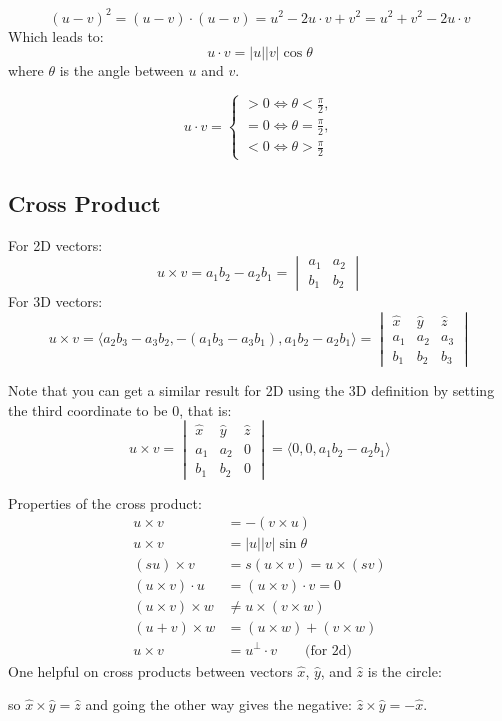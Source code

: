 \documentclass[12pt]{report}
\begin{document}
$$
(u - v)^2 = (u - v)\cdot(u - v) = u^2 -2u\cdot v + v^2 = u^2 + v^2 -2u\cdot v
$$
Which leads to:
$$
u \cdot v = |u||v|\cos\theta
$$
where $\theta$ is the angle between $u$ and $v$.
	
$$
u \cdot v = \begin{cases}
> 0 \Leftrightarrow \theta < \frac{\pi}{2},\\
= 0 \Leftrightarrow \theta = \frac{\pi}{2}, \\
< 0 \Leftrightarrow \theta > \frac{\pi}{2}
\end{cases}
$$
	
\subsection{Cross Product}
For 2D vectors:
$$
u \times v = a_1b_2 - a_2b_1 = \begin{vmatrix}a_1 & a_2 \\ b_1 & b_2 \end{vmatrix}
$$
For 3D vectors:
$$
u \times v = \langle a_2b_3 - a_3b_2, -(a_1b_3 - a_3b_1), a_1b_2 - a_2b_1\rangle = \begin{vmatrix}\hat{x} & \hat{y} & \hat{z} \\ a_1 & a_2 & a_3 \\ b_1 & b_2 & b_3\end{vmatrix}
$$
	
Note that you can get a similar result for 2D using the 3D definition by setting the third coordinate to be $0$, that is:
$$
u \times v =  \begin{vmatrix}\hat{x} & \hat{y} & \hat{z} \\ a_1 & a_2 & 0 \\ b_1 & b_2 & 0\end{vmatrix} = \langle 0, 0, a_1b_2 - a_2b_1\rangle
$$
	
Properties of the cross product:
\begin{align*}
	u \times v            & = -(v \times u)                 \\
	u \times v            & = |u||v|\sin\theta              \\
	(su) \times v         & = s(u \times v) = u \times (sv) \\
	(u \times v) \cdot u  & = (u \times v) \cdot v = 0      \\
	(u \times v) \times w & \neq u \times (v \times w)      \\
	(u + v)\times w       & = (u \times w) + (v \times w)   \\
	u \times v &= u^\perp \cdot v \qquad \text{(for 2d)}
\end{align*}
One helpful on cross products between vectors $\hat{x}$, $\hat{y}$, and $\hat{z}$ is the circle:
\begin{center}
\end{center}
so $\hat{x} \times \hat{y} = \hat{z}$ and going the other way gives the negative: $\hat{z} \times \hat{y} = -\hat{x}$.
\end{document}
